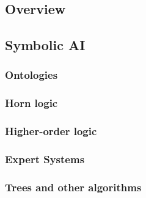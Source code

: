 
\chapter[Artificial Intelligence]{}
\label{ch:ai}

\section{Overview}\label{sec:ai-overview}

\section{Symbolic \Gls{AI}}\label{sec:symbolic-ai}

\subsection{}\label{subsec:cl}

\subsection{}\label{subsec:dl}

\subsection{Ontologies}\label{subsec:ontologies}

\subsection{Horn logic}\label{subsec:horn-logic}

\subsection{Higher-order logic}\label{subsec:higher-order-logic}

\subsection{Expert Systems}\label{subsec:expert-systems}

\subsection{Trees and other algorithms}\label{subsec:trees-and-other-algorithms}

